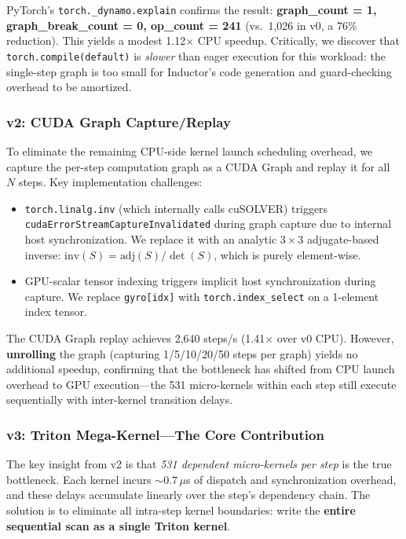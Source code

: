 \documentclass[pdflatex,sn-mathphys-num]{sn-jnl}%
\theoremstyle{thmstyleone}%
\theoremstyle{thmstyletwo}%
\theoremstyle{thmstylethree}%
\begin{document}
PyTorch's \texttt{torch.\_dynamo.explain} confirms the result: \textbf{graph\_count = 1, graph\_break\_count = 0, op\_count = 241} (vs.~1,026 in v0, a 76\% reduction). This yields a modest 1.12$\times$ CPU speedup. Critically, we discover that \texttt{torch.compile(default)} is \textit{slower} than eager execution for this workload: the single-step graph is too small for Inductor's code generation and guard-checking overhead to be amortized.

\subsubsection{v2: CUDA Graph Capture/Replay}

To eliminate the remaining CPU-side kernel launch scheduling overhead, we capture the per-step computation graph as a CUDA Graph and replay it for all $N$ steps. Key implementation challenges:

\begin{itemize}
\item \texttt{torch.linalg.inv} (which internally calls cuSOLVER) triggers \texttt{cudaErrorStreamCaptureInvalidated} during graph capture due to internal host synchronization. We replace it with an analytic $3\times3$ adjugate-based inverse: $\text{inv}(S) = \text{adj}(S) / \det(S)$, which is purely element-wise.
\item GPU-scalar tensor indexing triggers implicit host synchronization during capture. We replace \texttt{gyro[idx]} with \texttt{torch.index\_select} on a 1-element index tensor.
\end{itemize}

The CUDA Graph replay achieves 2,640 steps/s (1.41$\times$ over v0 CPU). However, \textbf{unrolling} the graph (capturing 1/5/10/20/50 steps per graph) yields no additional speedup, confirming that the bottleneck has shifted from CPU launch overhead to GPU execution---the 531 micro-kernels within each step still execute sequentially with inter-kernel transition delays.

\subsubsection{v3: Triton Mega-Kernel---The Core Contribution}

The key insight from v2 is that \textit{531 dependent micro-kernels per step} is the true bottleneck. Each kernel incurs $\sim 0.7\,\mu$s of dispatch and synchronization overhead, and these delays accumulate linearly over the step's dependency chain. The solution is to eliminate all intra-step kernel boundaries: write the \textbf{entire sequential scan as a single Triton kernel}.
\end{document}
